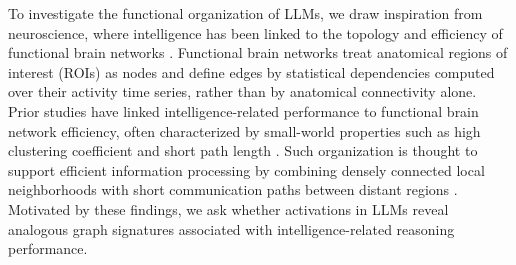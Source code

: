 To investigate the functional organization of LLMs, we draw inspiration from neuroscience, where intelligence has been linked to the topology and efficiency of functional brain networks \cite{langer2012functional, barbey2018network}. Functional brain networks treat anatomical regions of interest (ROIs) as nodes and define edges by statistical dependencies computed over their activity time series, rather than by anatomical connectivity alone. Prior studies have linked intelligence-related performance to functional brain network efficiency, often characterized by small-world properties such as high clustering coefficient and short path length \cite{langer2012functional, rosenberg2020functional}. Such organization is thought to support efficient information processing by combining densely connected local neighborhoods with short communication paths between distant regions \cite{latora2001efficient, bassett2017small}. Motivated by these findings, we ask whether activations in LLMs reveal analogous graph signatures associated with intelligence-related reasoning performance.




